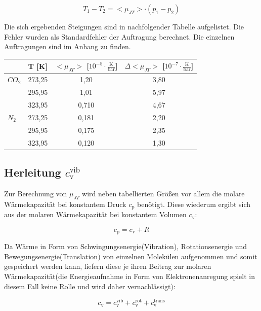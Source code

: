 \documentclass[12pt,a4paper,titlepage,headinclude,bibtotoc]{scrartcl}
\begin{document}
\begin{equation}
T_1 - T_2 = <\mu_{JT}> \cdot (p_1 - p_2)
\end{equation}

Die sich ergebenden Steigungen sind in nachfolgender Tabelle aufgelistet. Die Fehler wurden als Standardfehler der Auftragung berechnet. Die einzelnen Auftragungen sind im Anhang zu finden.\\

\begin{table} [h]
\begin{tabular} {l | c|  c | c}
	 &  T [K] & $<\mu_{JT}>$ [$  10^{-5}\cdot \frac{\mathrm{K}}{\mathrm{bar}}$] & $\Delta <\mu_{JT}>$  [$  10^{-7}\cdot \frac{\mathrm{K}}{\mathrm{bar}}$]\\
	 \hline
	  $CO_\mathrm{2}$ & 273,25 & 1,20 & 3,80 \\
	   & 295,95 & 1,01 & 5,97\\
	  & 323,95 & 0,710 & 4,67\\
	\hline
	$N_\mathrm{2}$ & 273,25 & 0,181  &  2,20\\
	& 295,95 & 0,175 & 2,35\\
	& 323,95& 0,120& 1,30\\
\end{tabular}
\end{table}


\subsection{Herleitung $c_\mathrm{v}^\mathrm{ vib}$}

Zur Berechnung von $\mu_{JT}$ wird neben tabellierten Größen vor allem die molare Wärmekapazität bei konstantem Druck $c_\mathrm{p}$ benötigt. Diese wiederum ergibt sich aus der molaren Wärmekapazität bei konstantem Volumen $c_\mathrm{v}$:

\begin{equation}
c_\mathrm{p} = c_\mathrm{v} +R
\end{equation}

Da Wärme in Form von Schwingungsenergie(Vibration), Rotationsenergie und Bewegungsenergie(Translation) von einzelnen Molekülen aufgenommen und somit gespeichert werden kann, liefern diese je ihren Beitrag zur molaren Wärmekapazität(die Energieaufnahme in Form von Elektronenanregung spielt in diesem Fall keine Rolle und wird daher vernachlässigt):

\begin{equation}
c_\mathrm{v} = c_\mathrm{v}^\mathrm{ vib} + c_\mathrm{v}^\mathrm{ rot} + c_\mathrm{v}^\mathrm{trans}  
\end{equation}
\end{document}
